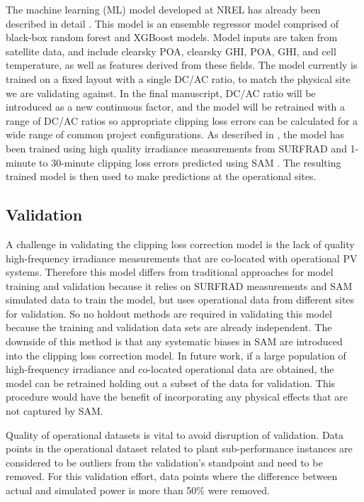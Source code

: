 \documentclass[conference]{IEEEtran}
\begin{document}
The machine learning (ML) model developed at NREL has already been described in detail \cite{Anderson2020}. This model is an ensemble regressor model comprised of black-box random forest and XGBoost models. Model inputs are taken from satellite data, and include clearsky POA, clearsky GHI, POA, GHI, and cell temperature, as well as features derived from these fields. The model currently is trained on a fixed layout with a single DC/AC ratio, to match the physical site we are validating against. In the final manuscript, DC/AC ratio will be introduced as a new continuous factor, and the model will be retrained with a range of DC/AC ratios so appropriate clipping loss errors can be calculated for a wide range of common project configurations. As described in \cite{Anderson2020}, the model has been trained using high quality irradiance measurements from SURFRAD \cite{Augustine2000} and 1-minute to 30-minute clipping loss errors predicted using SAM \cite{Freeman2018}. The resulting trained model is then used to make predictions at the operational sites.


\subsection{Validation}
A challenge in validating the clipping loss correction model is the lack of quality high-frequency irradiance measurements that are co-located with operational PV systems. Therefore this model differs from traditional approaches for model training and validation because it relies on SURFRAD measurements and SAM simulated data to train the model, but uses operational data from different sites for validation. So no holdout methods are required in validating this model because the training and validation data sets are already independent. The downside of this method is that any systematic biases in SAM are introduced into the clipping loss correction model. In future work, if a large population of high-frequency irradiance and co-located operational data are obtained, the model can be retrained holding out a subset of the data for validation. This procedure would have the benefit of incorporating any physical effects that are not captured by SAM.

Quality of operational datasets is vital to avoid disruption of validation. Data points in the operational dataset related to plant sub-performance instances are considered to be outliers from the validation's standpoint and need to be removed. For this validation effort, data points where the difference between actual and simulated power is more than 50\% were removed. 
\end{document}
